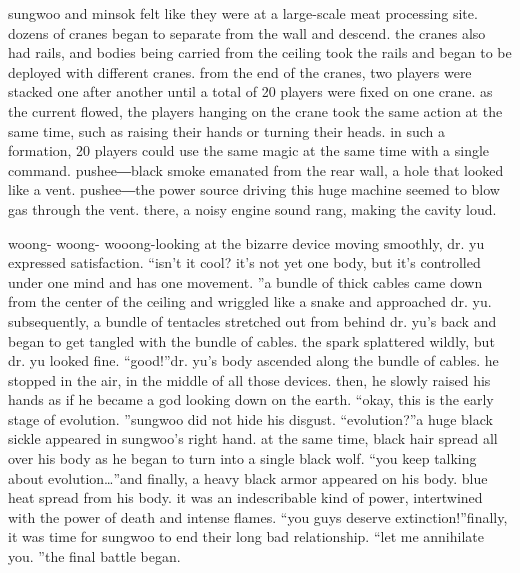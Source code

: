  sungwoo and minsok felt like they were at a large-scale meat processing site.
dozens of cranes began to separate from the wall and descend.
the cranes also had rails, and bodies being carried from the ceiling took the rails and began to be deployed with different cranes.
from the end of the cranes, two players were stacked one after another until a total of 20 players were fixed on one crane.
as the current flowed, the players hanging on the crane took the same action at the same time, such as raising their hands or turning their heads.
in such a formation, 20 players could use the same magic at the same time with a single command.
pushee―black smoke emanated from the rear wall, a hole that looked like a vent.
pushee―the power source driving this huge machine seemed to blow gas through the vent.
 there, a noisy engine sound rang, making the cavity loud.


woong- woong- wooong-looking at the bizarre device moving smoothly, dr.
 yu expressed satisfaction.
“isn’t it cool? it’s not yet one body, but it’s controlled under one mind and has one movement.
”a bundle of thick cables came down from the center of the ceiling and wriggled like a snake and approached dr.
 yu.
subsequently, a bundle of tentacles stretched out from behind dr.
 yu’s back and began to get tangled with the bundle of cables.
the spark splattered wildly, but dr.
 yu looked fine.
“good!”dr.
 yu’s body ascended along the bundle of cables.
 he stopped in the air, in the middle of all those devices.
then, he slowly raised his hands as if he became a god looking down on the earth.
“okay, this is the early stage of evolution.
”sungwoo did not hide his disgust.
“evolution?”a huge black sickle appeared in sungwoo’s right hand.
 at the same time, black hair spread all over his body as he began to turn into a single black wolf.
“you keep talking about evolution…”and finally, a heavy black armor appeared on his body.
 blue heat spread from his body.
it was an indescribable kind of power, intertwined with the power of death and intense flames.
“you guys deserve extinction!”finally, it was time for sungwoo to end their long bad relationship.
“let me annihilate you.
”the final battle began.


 